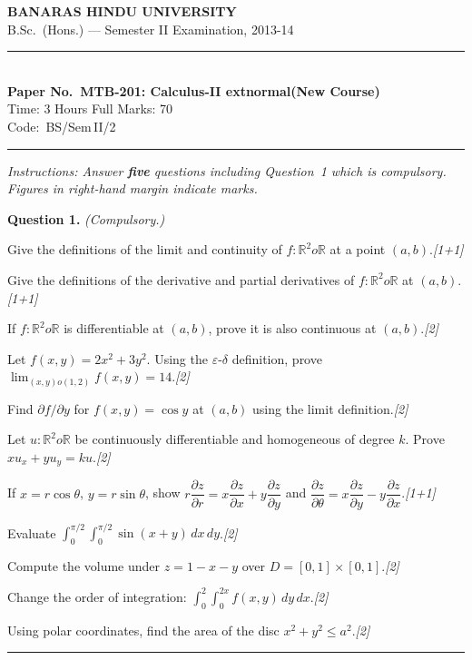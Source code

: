 \documentclass[11pt,a4paper]{article}
\newcommand{\pts}[1]{\hfill   \textit{[#1]}}
\begin{document}
\begin{center}
  {\large\bfseries BANARAS HINDU UNIVERSITY}\\[2pt]
  {\normalsize B.Sc.\ (Hons.) --- Semester II Examination, 2013-14}\\[6pt]
  \rule{0.8\linewidth}{0.5pt}\\[6pt]
  {\large\bfseries Paper No.\ MTB-201: Calculus-II  extnormal{(New Course)}}\\[4pt]
  {\normalsize Time: 3 Hours \hfill Full Marks: 70}\\[2pt]
  {\small Code:\ BS/Sem\,II/2}
\end{center}
\rule{\linewidth}{0.4pt}
\smallskip



\noindent   \textit{Instructions: Answer   \textbf{five} questions including Question~1 which is compulsory. Figures in right-hand margin indicate marks.}
\bigskip




\noindent   \textbf{Question 1.}   \textit{(Compulsory.)}

\begin{parts}
  \item Give the definitions of the limit and continuity of $f:\mathbb{R}^2 o\mathbb{R}$ at a point $(a,b)$.\pts{1+1}
  \item Give the definitions of the derivative and partial derivatives of $f:\mathbb{R}^2 o\mathbb{R}$ at $(a,b)$.\pts{1+1}
  \item If $f:\mathbb{R}^2 o\mathbb{R}$ is differentiable at $(a,b)$, prove it is also continuous at $(a,b)$.\pts{2}
  \item Let $f(x,y)=2x^2+3y^2$. Using the $\varepsilon$-$\delta$ definition, prove $\lim_{(x,y) o(1,2)}f(x,y)=14$.\pts{2}
  \item Find $\partial f/\partial y$ for $f(x,y)=\cos y$ at $(a,b)$ using the limit definition.\pts{2}
  \item Let $u:\mathbb{R}^2 o\mathbb{R}$ be continuously differentiable and homogeneous of degree $k$. Prove $x u_x+y u_y=ku$.\pts{2}
  \item If $x=r\cos \theta$, $y=r\sin \theta$, show $r\dfrac{\partial z}{\partial r}=x\dfrac{\partial z}{\partial x}+y\dfrac{\partial z}{\partial y}$ and $\dfrac{\partial z}{\partial \theta}=x\dfrac{\partial z}{\partial y}-y\dfrac{\partial z}{\partial x}$.\pts{1+1}
  \item Evaluate $\displaystyle\int_0^{\pi/2}\!\int_0^{\pi/2}\sin(x+y)\,dx\,dy$.\pts{2}
  \item Compute the volume under $z=1-x-y$ over $D=[0,1] \times[0,1]$.\pts{2}
  \item Change the order of integration: $\displaystyle\int_0^2\!\int_0^{2x}f(x,y)\,dy\,dx$.\pts{2}
  \item Using polar coordinates, find the area of the disc $x^2+y^2\leq a^2$.\pts{2}
\end{parts}
\medskip\rule{\linewidth}{0.2pt}
\end{document}
